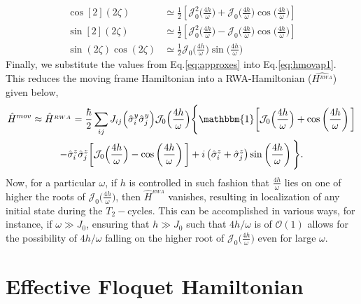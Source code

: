 \documentclass[12pt]{iopart}
\begin{document}
\begin{align}
	\cos[2](2\zeta) &\simeq \frac12\left[\mathcal{J}^2_0\Big(\frac{4h}{\omega}\Big) +  \mathcal{J}_0\Big(\frac{4h}{\omega}\Big) \cos\Big(\frac{4h}{\omega}\Big)\right]\nonumber\\
	\sin[2](2\zeta) &\simeq \frac12\left[\mathcal{J}^2_0\Big(\frac{4h}{\omega}\Big) - \mathcal{J}_0\Big(\frac{4h}{\omega}\Big) \cos\Big(\frac{4h}{\omega}\Big)\right] \nonumber\\
	\sin(2\zeta) \cos(2\zeta)&\simeq \frac12 \mathcal{J}_0\Big(\frac{4h}{\omega}\Big)\sin\Big(\frac{4h}{\omega}\Big) 
	\label{eq:approxes}	
\end{align}
Finally, we substitute the values from Eq.\eqref{eq:approxes} into Eq.\eqref{eq:hmovap1}. This reduces the moving frame Hamiltonian into a RWA-Hamiltonian ($\hat{H^{_{RWA}}}$) given below,
\begin{multline}
    \hat{H}^{mov}\approx \hat{H}^{_{RWA}} = \frac{\hbar}{2}\sum_{ij} J_{ij} \Big(\hat{\sigma}^y_i\hat{\sigma}^y_j\Big) \mathcal{J}_0\Big(\frac{4h}{\omega}\Big)\Bigg\{\mathbbm{1}\bigg[\mathcal{J}_0\Big(\frac{4h}{\omega}\Big) + \cos\left(\frac{4h}{\omega}\right)\bigg] \\
    -\hat{\sigma}^z_i\hat{\sigma}^z_j \bigg[\mathcal{J}_0\Big(\frac{4h}{\omega}\Big) - \cos\left(\frac{4h}{\omega}\right)\bigg] + i \left(\hat{\sigma}^z_i + \hat{\sigma}^z_j\right) \sin\left(\frac{4h}{\omega}\right)\Bigg\}.
    \label{eq:hrwa}
\end{multline}	
Now, for a particular $\omega$, if $h$ is controlled in such fashion that $\frac{4h}{\omega}$ lies on one of higher the roots of $\mathcal{J}_0\Big(\frac{4h}{\omega}\Big)$, then $\hat{H}^{_{RWA}}$ vanishes, resulting in localization of any initial state during the $T_2-$cycles. This can be accomplished in various ways, for instance, if $\omega\gg J_0$, ensuring that $h\gg J_0$ such that $4h/\omega$ is of $\mathcal{O}(1)$ allows for the possibility of $4h/\omega$ falling on the higher root of $\mathcal{J}_0\Big(\frac{4h}{\omega}\Big)$ even for large $\omega$.

\section{\label{sec:AppendixB} Effective Floquet Hamiltonian}
\end{document}
